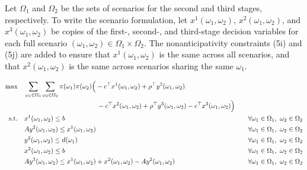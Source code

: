 \documentclass[8pt]{article}
\begin{document}
Let $\Omega_1$ and $\Omega_2$ be the sets of scenarios for the second and third
stages, respectively. To write the scenario formulation, let $x^1(\omega_1,
    \omega_2)$, $x^2(\omega_1, \omega_2)$, and $x^3(\omega_1, \omega_2)$ be copies
of the first-, second-, and third-stage decision variables for each full
scenario $(\omega_1, \omega_2) \in \Omega_1 \times \Omega_2$. The
nonanticipativity constraints (5i) and (5j) are added to ensure that
$x^1(\omega_1, \omega_2)$ is the same across all scenarios, and that
$x^2(\omega_1, \omega_2)$ is the same across scenarios sharing the same
$\omega_1$.

\begin{subequations}
    \begin{align}
        \max \quad
         & \sum_{\omega_1 \in \Omega_1} \sum_{\omega_2 \in \Omega_2} \pi(\omega_1) \pi(\omega_2)
        \Big( -c^\top x^1(\omega_1, \omega_2) + \rho^\top y^2(\omega_1, \omega_2)                                                                                                \\
         & \quad\quad\quad\quad\quad\quad\quad\quad\quad\quad\quad -c^\top x^2(\omega_1, \omega_2) + \rho^\top y^3(\omega_1, \omega_2) -c^\top x^3(\omega_1, \omega_2) \Big) \notag
        \\
        \text{s.t.} \quad
         & x^1(\omega_1, \omega_2) \leq b
         & \quad \forall \omega_1 \in \Omega_1,\ \omega_2 \in \Omega_2                                                                                                                 \\
         & A y^2(\omega_1, \omega_2) \leq x^1(\omega_1, \omega_2)
         & \quad \forall \omega_1 \in \Omega_1,\ \omega_2 \in \Omega_2                                                                                                                 \\
         & y^2(\omega_1, \omega_2) \leq d(\omega_1)
         & \quad \forall \omega_1 \in \Omega_1,\ \omega_2 \in \Omega_2                                                                                                                 \\
         & x^2(\omega_1, \omega_2) \leq b
         & \quad \forall \omega_1 \in \Omega_1,\ \omega_2 \in \Omega_2                                                                                                                 \\
         & A y^3(\omega_1, \omega_2) \leq x^1(\omega_1, \omega_2) + x^2(\omega_1, \omega_2) - Ay^2(\omega_1, \omega_2)
         & \quad \forall \omega_1 \in \Omega_1,\ \omega_2 \in \Omega_2                                                                                                                 \\

\end{align}
\end{subequations}
\end{document}
